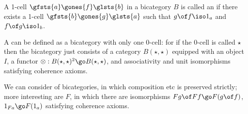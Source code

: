 A 1-cell $\gfsts{a}\gones{f}\glsts{b}$ in a bicategory $B$ is called an
 if there exists a 1-cell $\gfsts{b}\gones{g}\glsts{a}$
such that $g\of f \iso 1_a$ and $f\of g \iso 1_b$.  

A  can be defined as a bicategory with only one
0-cell: for if the 0-cell is called $\star$ then the bicategory just consists
of a category $B(\star,\star)$ equipped with an object $I$, a functor
$\otimes: B(\star,\star)^2 \go B(\star,\star)$, and associativity and unit
isomorphisms satisfying coherence axioms.

We can consider  of bicategories, in which composition
etc is preserved strictly; more interesting are  $F$, in
which there are isomorphisms $Fg \of Ff \go F(g \of f)$, $1_{Fa} \go
F(1_a)$ satisfying coherence axioms.
